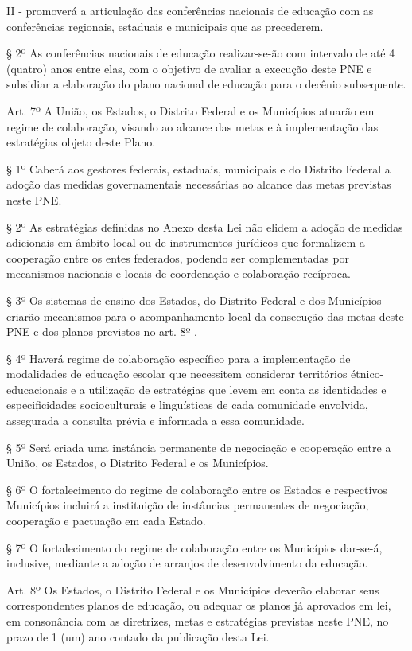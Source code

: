 \documentclass[
]{book}
\begin{document}
II - promoverá a articulação das conferências nacionais de educação com as conferências regionais, estaduais e municipais que as precederem.

§ 2º As conferências nacionais de educação realizar-se-ão com intervalo de até 4 (quatro) anos entre elas, com o objetivo de avaliar a execução deste PNE e subsidiar a elaboração do plano nacional de educação para o decênio subsequente.

Art. 7º A União, os Estados, o Distrito Federal e os Municípios atuarão em regime de colaboração, visando ao alcance das metas e à implementação das estratégias objeto deste Plano.

§ 1º Caberá aos gestores federais, estaduais, municipais e do Distrito Federal a adoção das medidas governamentais necessárias ao alcance das metas previstas neste PNE.

§ 2º As estratégias definidas no Anexo desta Lei não elidem a adoção de medidas adicionais em âmbito local ou de instrumentos jurídicos que formalizem a cooperação entre os entes federados, podendo ser complementadas por mecanismos nacionais e locais de coordenação e colaboração recíproca.

§ 3º Os sistemas de ensino dos Estados, do Distrito Federal e dos Municípios criarão mecanismos para o acompanhamento local da consecução das metas deste PNE e dos planos previstos no art. 8º .

§ 4º Haverá regime de colaboração específico para a implementação de modalidades de educação escolar que necessitem considerar territórios étnico-educacionais e a utilização de estratégias que levem em conta as identidades e especificidades socioculturais e linguísticas de cada comunidade envolvida, assegurada a consulta prévia e informada a essa comunidade.

§ 5º Será criada uma instância permanente de negociação e cooperação entre a União, os Estados, o Distrito Federal e os Municípios.

§ 6º O fortalecimento do regime de colaboração entre os Estados e respectivos Municípios incluirá a instituição de instâncias permanentes de negociação, cooperação e pactuação em cada Estado.

§ 7º O fortalecimento do regime de colaboração entre os Municípios dar-se-á, inclusive, mediante a adoção de arranjos de desenvolvimento da educação.

Art. 8º Os Estados, o Distrito Federal e os Municípios deverão elaborar seus correspondentes planos de educação, ou adequar os planos já aprovados em lei, em consonância com as diretrizes, metas e estratégias previstas neste PNE, no prazo de 1 (um) ano contado da publicação desta Lei.
\end{document}
